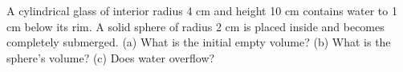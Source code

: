 A cylindrical glass of interior radius 4 cm and height 10 cm contains water to 1 cm below its rim. A solid sphere of radius 2 cm is placed inside and becomes completely submerged. (a) What is the initial empty volume? (b) What is the sphere's volume? (c) Does water overflow?
